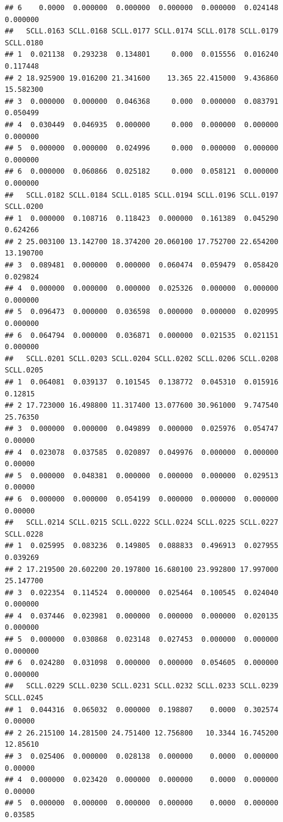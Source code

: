 \documentclass[
]{article}
\begin{document}
\begin{verbatim}
## 6    0.0000  0.000000  0.000000  0.000000  0.000000  0.024148  0.000000
##   SCLL.0163 SCLL.0168 SCLL.0177 SCLL.0174 SCLL.0178 SCLL.0179 SCLL.0180
## 1  0.021138  0.293238  0.134801     0.000  0.015556  0.016240  0.117448
## 2 18.925900 19.016200 21.341600    13.365 22.415000  9.436860 15.582300
## 3  0.000000  0.000000  0.046368     0.000  0.000000  0.083791  0.050499
## 4  0.030449  0.046935  0.000000     0.000  0.000000  0.000000  0.000000
## 5  0.000000  0.000000  0.024996     0.000  0.000000  0.000000  0.000000
## 6  0.000000  0.060866  0.025182     0.000  0.058121  0.000000  0.000000
##   SCLL.0182 SCLL.0184 SCLL.0185 SCLL.0194 SCLL.0196 SCLL.0197 SCLL.0200
## 1  0.000000  0.108716  0.118423  0.000000  0.161389  0.045290  0.624266
## 2 25.003100 13.142700 18.374200 20.060100 17.752700 22.654200 13.190700
## 3  0.089481  0.000000  0.000000  0.060474  0.059479  0.058420  0.029824
## 4  0.000000  0.000000  0.000000  0.025326  0.000000  0.000000  0.000000
## 5  0.096473  0.000000  0.036598  0.000000  0.000000  0.020995  0.000000
## 6  0.064794  0.000000  0.036871  0.000000  0.021535  0.021151  0.000000
##   SCLL.0201 SCLL.0203 SCLL.0204 SCLL.0202 SCLL.0206 SCLL.0208 SCLL.0205
## 1  0.064081  0.039137  0.101545  0.138772  0.045310  0.015916   0.12815
## 2 17.723000 16.498800 11.317400 13.077600 30.961000  9.747540  25.76350
## 3  0.000000  0.000000  0.049899  0.000000  0.025976  0.054747   0.00000
## 4  0.023078  0.037585  0.020897  0.049976  0.000000  0.000000   0.00000
## 5  0.000000  0.048381  0.000000  0.000000  0.000000  0.029513   0.00000
## 6  0.000000  0.000000  0.054199  0.000000  0.000000  0.000000   0.00000
##   SCLL.0214 SCLL.0215 SCLL.0222 SCLL.0224 SCLL.0225 SCLL.0227 SCLL.0228
## 1  0.025995  0.083236  0.149805  0.088833  0.496913  0.027955  0.039269
## 2 17.219500 20.602200 20.197800 16.680100 23.992800 17.997000 25.147700
## 3  0.022354  0.114524  0.000000  0.025464  0.100545  0.024040  0.000000
## 4  0.037446  0.023981  0.000000  0.000000  0.000000  0.020135  0.000000
## 5  0.000000  0.030868  0.023148  0.027453  0.000000  0.000000  0.000000
## 6  0.024280  0.031098  0.000000  0.000000  0.054605  0.000000  0.000000
##   SCLL.0229 SCLL.0230 SCLL.0231 SCLL.0232 SCLL.0233 SCLL.0239 SCLL.0245
## 1  0.044316  0.065032  0.000000  0.198807    0.0000  0.302574   0.00000
## 2 26.215100 14.281500 24.751400 12.756800   10.3344 16.745200  12.85610
## 3  0.025406  0.000000  0.028138  0.000000    0.0000  0.000000   0.00000
## 4  0.000000  0.023420  0.000000  0.000000    0.0000  0.000000   0.00000
## 5  0.000000  0.000000  0.000000  0.000000    0.0000  0.000000   0.03585

\end{verbatim}
\end{document}
